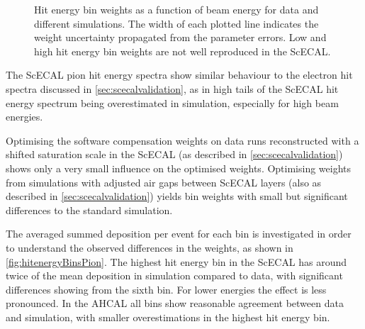\documentclass[twoside,a4paper,12pt]{article}
\begin{document}
\begin{figure}[htbp]
	\caption{Hit energy bin weights as a function of beam energy for data and different simulations. The width of each plotted line indicates the weight uncertainty propagated from the parameter errors. Low and high hit energy bin weights are not well reproduced in the ScECAL.}
	\label{fig:SCWeightsDataVsMC}
\end{figure}

The ScECAL pion hit energy spectra show similar behaviour to the electron hit spectra discussed in \autoref{sec:scecalvalidation}, as in high tails of the ScECAL hit energy spectrum being overestimated in simulation, especially for high beam energies. 

Optimising the software compensation weights on data runs reconstructed with a shifted saturation scale in the ScECAL (as described in \autoref{sec:scecalvalidation}) shows only a very small influence on the optimised weights. Optimising weights from simulations with adjusted air gaps between ScECAL layers (also as described in \autoref{sec:scecalvalidation}) yields bin weights with small but significant differences to the standard simulation.

The averaged summed deposition per event for each bin is investigated in order to understand the observed differences in the weights, as shown in \autoref{fig:hitenergyBinsPion}. The highest hit energy bin in the ScECAL has around twice of the mean deposition in simulation compared to data, with significant differences showing from the sixth bin. For lower energies the effect is less pronounced. In the AHCAL all bins show reasonable agreement between data and simulation, with smaller overestimations in the highest hit energy bin.
\end{document}
